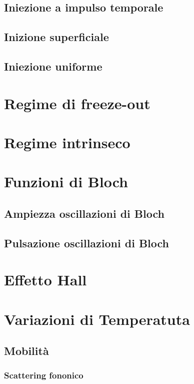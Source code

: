 \documentclass[10pt,a4paper]{report}
\begin{document}
	\section{Iniezione a impulso temporale}

	\section{Inizione superficiale}

	\section{Iniezione uniforme}

\chapter{Regime di freeze-out}

\chapter{Regime intrinseco}

\chapter{Funzioni di Bloch}

	\section{Ampiezza oscillazioni di Bloch}

	\section{Pulsazione oscillazioni di Bloch}

\chapter{Effetto Hall}

\chapter{Variazioni di Temperatuta}

	\section{Mobilità}

		\subsection{Scattering fononico}
\end{document}
